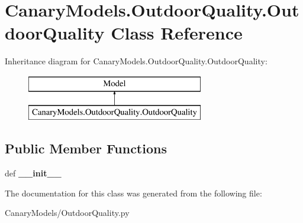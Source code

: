 \hypertarget{class_canary_models_1_1_outdoor_quality_1_1_outdoor_quality}{\section{Canary\-Models.\-Outdoor\-Quality.\-Outdoor\-Quality Class Reference}
\label{class_canary_models_1_1_outdoor_quality_1_1_outdoor_quality}
}
Inheritance diagram for Canary\-Models.\-Outdoor\-Quality.\-Outdoor\-Quality\-:\begin{figure}[H]
\begin{center}
\leavevmode
\includegraphics[height=2.000000cm]{class_canary_models_1_1_outdoor_quality_1_1_outdoor_quality}
\end{center}
\end{figure}
\subsection*{Public Member Functions}
\begin{DoxyCompactItemize}
\item 
\hypertarget{class_canary_models_1_1_outdoor_quality_1_1_outdoor_quality_a5257e4739c153fafc7d52201ebd85596}{def {\bfseries \-\_\-\-\_\-init\-\_\-\-\_\-}}\label{class_canary_models_1_1_outdoor_quality_1_1_outdoor_quality_a5257e4739c153fafc7d52201ebd85596}

\end{DoxyCompactItemize}


The documentation for this class was generated from the following file\-:\begin{DoxyCompactItemize}
\item 
Canary\-Models/Outdoor\-Quality.\-py\end{DoxyCompactItemize}
